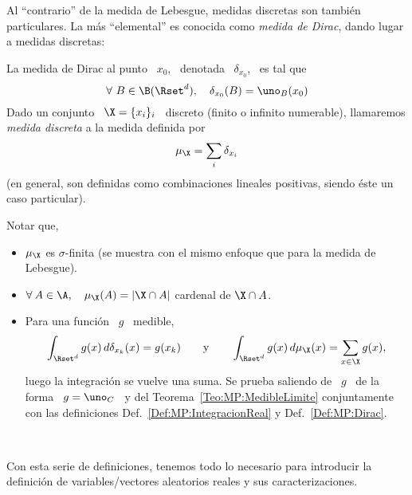Al  ``contrario'' de  la medida  de  Lebesgue, medidas  discretas son  tambi\'en
particulares. La  m\'as ``elemental''  es conocida como  {\it medida  de Dirac},
dando lugar a medidas discretas:
%
\begin{definicion}
\label{Def:MP:Dirac}
%
  La medida de Dirac al punto \ $x_0$, \ denotada \ $\delta_{x_0}$, \ es tal que
  \[
  \forall   \  B  \in   \B(\Rset^d),  \quad   \delta_{x_0}(B)  =   \uno_B(x_0)
  \]
  Dado un conjunto \ $\X = \{  x_i \}_i$ \ discreto (finito o infinito numerable),
  llamaremos {\it medida discreta} a la medida definida por
  \[
  \mu_\X = \sum_i \delta_{x_i}
  \]
  (en  general,  son definidas  como  combinaciones  lineales positivas,  siendo
  \'este un caso particular).
\end{definicion}
%
Notar que,
%
\begin{itemize}
%
\item $\mu_\X$ es  $\sigma$-finita (se muestra con el mismo  enfoque que para la
  medida de Lebesgue).
%
\item $\forall  \: A \in \A,  \quad \mu_\X(A) =  |\X \cap A|$ cardenal de $\X \cap A$.
%
\item Para una funci\'on \ $g$ \ medible,
  \[
  \int_{\Rset^d} g(x) \, d\delta_{x_k}(x) = g(x_k) \qquad \mbox{y} \qquad
  \int_{\Rset^d} g(x) \, d\mu_\X(x) = \sum_{x \in \X} g(x),
  \]
  luego la integraci\'on se  vuelve una suma.  Se prueba saliendo de  \ $g$ \ de
  la   forma  \  $g   =  \uno_C$   \  y   del  Teorema~\ref{Teo:MP:MedibleLimite}
  conjuntamente   con  las   definiciones   Def.~\ref{Def:MP:IntegracionReal}  y
  Def.~\ref{Def:MP:Dirac}.
\end{itemize}

\

Con esta  serie de  definiciones, tenemos todo  lo necesario para  introducir la
definici\'on de variables/vectores aleatorios reales y sus caracterizaciones.



\label{Ssec:MP:VAGeneral}

